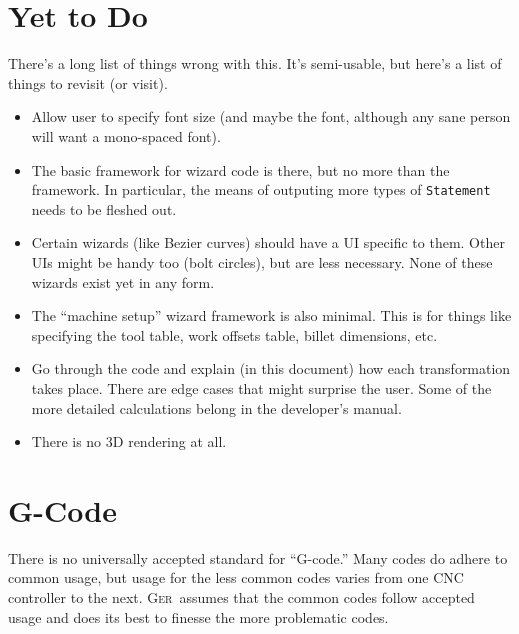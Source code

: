 \documentclass[titlepage,oneside,10pt]{article}
\newcommand{\ger}{\textsc{Ger}}
\begin{document}
\raggedbottom

\newcommand{\mymargin}[1]{\marginpar{\rm\tiny #1}}
\newcommand{\leftmar}[1]{\reversemarginpar \mymargin{#1}}

\section{Yet to Do}

There's a long list of things wrong with this. It's semi-usable, but
here's a list of things to revisit (or visit).
\begin{itemize}
\item Allow user to specify font size (and maybe the font, although
  any sane person will want a mono-spaced font).
\item The basic framework for wizard code is there, but no more than
  the framework. In particular, the means of outputing more types of
  {\tt Statement} needs to be fleshed out.
\item Certain wizards (like Bezier curves) should have a UI specific
  to them. Other UIs might be handy too (bolt circles), but are less
  necessary. None of these wizards exist yet in any form.
\item The ``machine setup'' wizard framework is also minimal. This is
  for things like specifying the tool table, work offsets table,
  billet dimensions, etc.
\item Go through the code and explain (in this document) how each
  transformation takes place. There are edge cases that might surprise
  the user. Some of the more detailed calculations belong in the
  developer's manual.
\item There is no 3D rendering at all.
\end{itemize}

\section{G-Code}

There is no universally accepted standard for ``G-code.'' Many codes
do adhere to common usage, but usage for the less common codes varies
from one CNC controller to the next. \ger\ assumes that the common
codes follow accepted usage and does its best to finesse the more
problematic codes.
\end{document}
